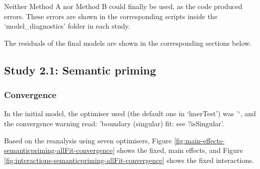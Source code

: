 \documentclass[
  12pt,
  man,floatsintext]{apa7}
\begin{document}
Neither Method A nor Method B could finally be used, as the code produced errors. These errors are shown in the corresponding scripts inside the `model\_diagnostics' folder in each study.

The residuals of the final models are shown in the corresponding sections below.

\hypertarget{study-2.1-semantic-priming-2}{%
\subsection{Study 2.1: Semantic priming}\label{study-2.1-semantic-priming-2}}

\hypertarget{convergence-2}{%
\subsubsection{Convergence}\label{convergence-2}}

In the initial model, the optimiser used (the default one in `lmerTest') was '`, and the convergence warning read: 'boundary (singular) fit: see ?isSingular'.

Based on the reanalysis using seven optimisers, Figure \ref{fig:main-effects-semanticpriming-allFit-convergence} shows the fixed, main effects, and Figure \ref{fig:interactions-semanticpriming-allFit-convergence} shows the fixed interactions.
\end{document}
